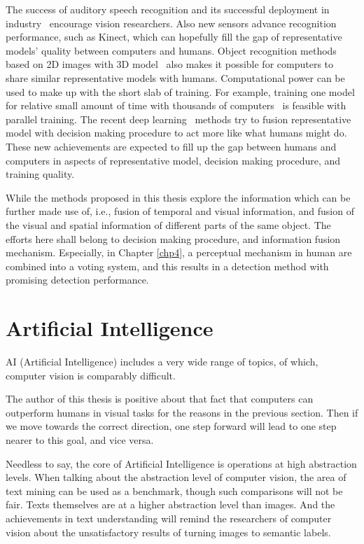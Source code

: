 The success of auditory speech recognition and its successful deployment in industry~\citep{siri} encourage vision researchers. Also new sensors advance recognition performance, such as Kinect, which can hopefully fill the gap of representative models' quality between computers and humans. Object recognition methods based on 2D images with 3D model~\citep{r3d} also makes it possible for computers to share similar representative models with humans.  Computational power can be used to make up with the short slab of training. For example, training one model for relative small amount of time with thousands of computers~\citep{dnnnn} is feasible with parallel training. The recent deep learning~\citep{dlearn} methods try to fusion representative model with decision making procedure to act more like what humans might do. These new achievements are expected to fill up the gap between humans and computers in aspects of representative model, decision making procedure, and training quality.



While the methods proposed in this thesis explore the information which can be further made use of, i.e., fusion of temporal and visual information, and fusion of the visual and spatial information of different parts of the same object. The efforts here shall belong to decision making procedure, and information fusion mechanism. Especially, in Chapter \ref{chp4}, a perceptual mechanism in human are combined into a voting system, and this results in a detection method with promising detection performance.

\section{Artificial Intelligence}
\label{ch2ai}
AI (Artificial Intelligence) includes a very wide range of topics, of which, computer vision is comparably difficult.

The author of this thesis is positive about that fact that computers can outperform humans in visual tasks for the reasons in the previous section. Then if we move towards the correct direction, one step forward will lead to one step nearer to this goal, and vice versa.

Needless to say, the core of Artificial Intelligence is operations at high abstraction levels. When talking about the abstraction level of computer vision, the area of text mining can be used as a benchmark, though such comparisons will not be fair. Texts themselves are at a higher abstraction level than images. And the achievements in text understanding will remind the researchers of computer vision about the unsatisfactory results of turning images to semantic labels.

